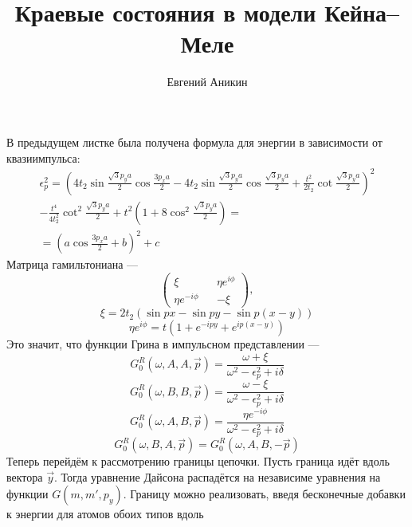 \documentclass{article}
\title{Краевые состояния в модели Кейна--Меле}
\author{Евгений Аникин}
\begin{document}
	\maketitle
	В предыдущем листке была получена формула для энергии в зависимости от квазиимпульса:
	\begin{multline}
		\epsilon_p^2 = \left(4t_2\sin{\frac{\sqrt{3}p_ya}{2}} \cos{\frac{3p_xa}{2}} - 
				4t_2\sin{\frac{\sqrt{3}p_ya}{2}} \cos{\frac{\sqrt{3}p_ya}{2}} +
				\frac{t^2}{2t_2} \cot{\frac{\sqrt{3}p_ya}{2}}\right)^2\\
				- \frac{t^4}{4t_2^2}\cot^2{\frac{\sqrt{3}p_ya}{2}}
				+ t^2\left(1 + 8\cos^2{\frac{\sqrt{3}p_ya}{2}}\right) = \\
				= \left(a\cos{\frac{3p_xa}{2}} + b\right)^2 + c
	\end{multline}
	Матрица гамильтониана --- 
	\begin{equation}
		\left(
		\begin{matrix}
			\xi && \eta e^{i\phi} \\
			\eta e^{-i\phi} && -\xi
		\end{matrix}
		\right),
	\end{equation}
	\begin{equation}
		\xi = 2t_2 (\sin{px} - \sin{py} - \sin{p(x-y)}) 
	\end{equation}
	\begin{equation}
		\eta e^{i\phi} = t(1 + e^{-ipy} + e^{ip(x-y)}) 
	\end{equation}
	Это значит, что функции Грина в импульсном представлении ---
	\begin{equation}
		G^R_0(\omega,A,A, \vec{p}) = \frac{\omega + \xi}{\omega^2 - \epsilon_p^2 + i\delta}
	\end{equation}
	\begin{equation}
		G^R_0(\omega,B,B, \vec{p}) = \frac{\omega - \xi}{\omega^2 - \epsilon_p^2 + i\delta}
	\end{equation}
	\begin{equation}
		G^R_0(\omega,A,B, \vec{p}) = \frac{\eta e^{-i\phi}}{\omega^2 - \epsilon_p^2 + i\delta}
	\end{equation}
	\begin{equation}
		G^R_0(\omega,B,A, \vec{p}) = G^R_0(\omega,A,B, -\vec{p})
	\end{equation}
	Теперь перейдём к рассмотрению границы цепочки. Пусть граница идёт вдоль вектора $\vec{y}$.
	Тогда уравнение Дайсона распадётся на независиме уравнения на функции $G(m,m',p_y)$. Границу
	можно реализовать, введя бесконечные добавки к энергии для атомов обоих типов вдоль
\end{document}
